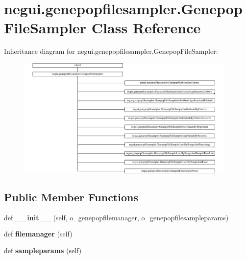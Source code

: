 \hypertarget{classnegui_1_1genepopfilesampler_1_1GenepopFileSampler}{}\section{negui.\+genepopfilesampler.\+Genepop\+File\+Sampler Class Reference}
\label{classnegui_1_1genepopfilesampler_1_1GenepopFileSampler}
Inheritance diagram for negui.\+genepopfilesampler.\+Genepop\+File\+Sampler\+:\begin{figure}[H]
\begin{center}
\leavevmode
\includegraphics[height=5.957447cm]{classnegui_1_1genepopfilesampler_1_1GenepopFileSampler}
\end{center}
\end{figure}
\subsection*{Public Member Functions}
\begin{DoxyCompactItemize}
\item 
def {\bfseries \+\_\+\+\_\+init\+\_\+\+\_\+} (self, o\+\_\+genepopfilemanager, o\+\_\+genepopfilesampleparams)\hypertarget{classnegui_1_1genepopfilesampler_1_1GenepopFileSampler_abcaee019cd11b009568dde7fa2e94341}{}\label{classnegui_1_1genepopfilesampler_1_1GenepopFileSampler_abcaee019cd11b009568dde7fa2e94341}

\item 
def {\bfseries filemanager} (self)\hypertarget{classnegui_1_1genepopfilesampler_1_1GenepopFileSampler_a58431ed64951ef4a3cf813c9ee2624b3}{}\label{classnegui_1_1genepopfilesampler_1_1GenepopFileSampler_a58431ed64951ef4a3cf813c9ee2624b3}

\item 
def {\bfseries sampleparams} (self)\hypertarget{classnegui_1_1genepopfilesampler_1_1GenepopFileSampler_ad48f60ff378a777538a886b058eb0e00}{}\label{classnegui_1_1genepopfilesampler_1_1GenepopFileSampler_ad48f60ff378a777538a886b058eb0e00}

\end{DoxyCompactItemize}


